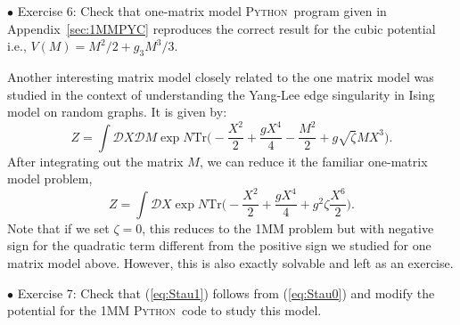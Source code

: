 \documentclass[letter,11pt]{article}
\newcommand{\PY}{\textsc{Python}}
\begin{document}
\begin{mdframed}[backgroundcolor=blue!3] 
	$\bullet$ Exercise 6:  Check that one-matrix model \PY~program given in Appendix~\ref{sec:1MMPYC} reproduces the correct result for the cubic potential 
	i.e., $V(M) = M^2/2 + g_{3}M^3/3$.  
	\label{ex:6} 
\end{mdframed} 
Another interesting matrix model closely related to the one matrix model was 
studied in the context of understanding the Yang-Lee edge singularity
\cite{Staudacher:1989fy} in Ising model on random graphs. 
It is given by: 
\begin{equation}
	\label{eq:Stau0}
	Z = \int \mathcal{D}X \mathcal{D}M \exp N \mbox{Tr}\Bigg(-\frac{X^2}{2} + \frac{gX^4}{4} - \frac{M^2}{2} + g \sqrt{\zeta} MX^3 \Bigg).
\end{equation}
After integrating out the matrix $M$, we can reduce it the familiar one-matrix model problem, 
\begin{equation}
	\label{eq:Stau1} 
	Z = \int \mathcal{D}X \exp N \mbox{Tr}\Bigg(-\frac{X^2}{2} + \frac{gX^4}{4} + g^2 \zeta  \frac{X^6}{2}   \Bigg).
\end{equation}
Note that if we set $\zeta=0$, this reduces to the 1MM problem but with negative sign for the quadratic term different from the positive sign we studied for one matrix model above. However, this is also exactly solvable and left as an exercise. 
\begin{mdframed}[backgroundcolor=blue!3]  
	$\bullet$ Exercise 7: Check that (\ref{eq:Stau1}) follows from (\ref{eq:Stau0}) and modify the potential for the 1MM \PY~code to study this model. 
\end{mdframed} 
\end{document}
